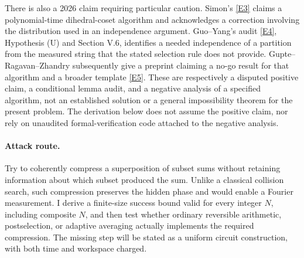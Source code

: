 \documentclass[11pt,a4paper]{article}
\newcommand{\eref}[2]{\hyperlink{extra:#1:#2}{[E#2]}}
\begin{document}
There is also a 2026 claim requiring particular caution. Simon's
\eref{30006794}{3} claims a polynomial-time dihedral-coset algorithm and
acknowledges a correction involving the distribution used in an
independence argument. Guo--Yang's audit \eref{30006794}{4}, Hypothesis (U) and
Section V.6, identifies a needed independence of a partition from the
measured string that the stated selection rule does not provide.
Gupte--Ragavan--Zhandry subsequently give a preprint claiming a no-go result
for that algorithm and a broader template \eref{30006794}{5}.
These are respectively a disputed positive claim, a conditional lemma
audit, and a negative analysis of a specified algorithm, not an established
solution or a general impossibility theorem for the present problem.
The derivation below does not assume the positive claim, nor rely on
unaudited formal-verification code attached to the negative analysis.

\paragraph{Attack route.}
Try to coherently compress a superposition of subset sums without
retaining information about which subset produced the sum. Unlike a
classical collision search, such compression preserves the hidden phase
and would enable a Fourier measurement. I derive a finite-size success
bound valid for every integer $N$, including composite $N$, and then test
whether ordinary reversible arithmetic, postselection, or adaptive
averaging actually implements the required compression. The missing step
will be stated as a uniform circuit construction, with both time and
workspace charged.
\end{document}

